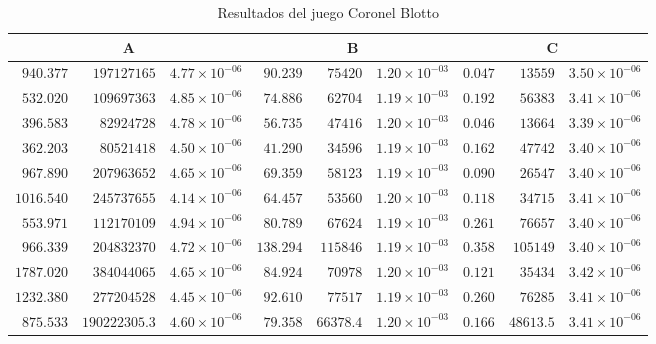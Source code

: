 \begin{table}[hbt!]
   \scriptsize
    \centering
    \begin{tabular}{r r r | r r r | r r r}
    \multicolumn{3}{c}{A} & \multicolumn{3}{c}{B} & \multicolumn{3}{c}{C} \\ \hline
	$940.377$ & $197127165$ & $4.77 {\times} 10^{-06}$ & $90.239$ & $75420$ & $1.20 {\times} 10^{-03}$ & $0.047$ & $13559$ & $3.50 {\times} 10^{-06}$ \\
	$532.020$ & $109697363$ & $4.85 {\times} 10^{-06}$ & $74.886$ & $62704$ & $1.19 {\times} 10^{-03}$ & $0.192$ & $56383$ & $3.41 {\times} 10^{-06}$ \\
	$396.583$ & $82924728$ & $4.78 {\times} 10^{-06}$ & $56.735$ & $47416$ & $1.20 {\times} 10^{-03}$ & $0.046$ & $13664$ & $3.39 {\times} 10^{-06}$ \\
	$362.203$ & $80521418$ & $4.50 {\times} 10^{-06}$ & $41.290$ & $34596$ & $1.19 {\times} 10^{-03}$ & $0.162$ & $47742$ & $3.40 {\times} 10^{-06}$ \\
	$967.890$ & $207963652$ & $4.65 {\times} 10^{-06}$ & $69.359$ & $58123$ & $1.19 {\times} 10^{-03}$ & $0.090$ & $26547$ & $3.40 {\times} 10^{-06}$ \\
	$1016.540$ & $245737655$ & $4.14 {\times} 10^{-06}$ & $64.457$ & $53560$ & $1.20 {\times} 10^{-03}$ & $0.118$ & $34715$ & $3.41 {\times} 10^{-06}$ \\
	$553.971$ & $112170109$ & $4.94 {\times} 10^{-06}$ & $80.789$ & $67624$ & $1.19 {\times} 10^{-03}$ & $0.261$ & $76657$ & $3.40 {\times} 10^{-06}$ \\
	$966.339$ & $204832370$ & $4.72 {\times} 10^{-06}$ & $138.294$ & $115846$ & $1.19 {\times} 10^{-03}$ & $0.358$ & $105149$ & $3.40 {\times} 10^{-06}$ \\
	$1787.020$ & $384044065$ & $4.65 {\times} 10^{-06}$ & $84.924$ & $70978$ & $1.20 {\times} 10^{-03}$ & $0.121$ & $35434$ & $3.42 {\times} 10^{-06}$ \\
	$1232.380$ & $277204528$ & $4.45 {\times} 10^{-06}$ & $92.610$ & $77517$ & $1.19 {\times} 10^{-03}$ & $0.260$ & $76285$ & $3.41 {\times} 10^{-06}$ \\ \hline
	$875.533$ & $190222305.3$ & $4.60 {\times} 10^{-06}$ & $79.358$ & $66378.4$ & $1.20 {\times} 10^{-03}$ & $0.166$ & $48613.5$ & $3.41 {\times} 10^{-06}$ \\ \hline
    \end{tabular}
    \caption{Resultados del juego Coronel Blotto}
    \label{tab:resultados-coronel-blotto}
\end{table}

